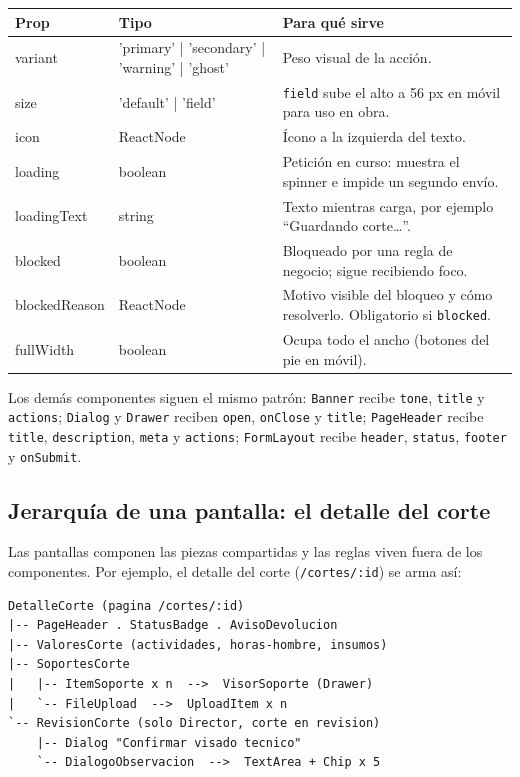 \documentclass[11pt]{article}
\begin{document}
\begin{center}
\begin{tabular}{|>{\ttfamily}m{3cm}|>{\ttfamily\raggedright\arraybackslash}m{4.4cm}|>{\raggedright\arraybackslash}m{7.8cm}|}
\hline
\textrm{\textbf{Prop}} & \textrm{\textbf{Tipo}} & \textbf{Para qué sirve} \\ \hline
variant & 'primary' | 'secondary' | 'warning' | 'ghost' & Peso visual de la acción. \\ \hline
size & 'default' | 'field' & \texttt{field} sube el alto a 56 px en móvil para uso en obra. \\ \hline
icon & ReactNode & Ícono a la izquierda del texto. \\ \hline
loading & boolean & Petición en curso: muestra el spinner e impide un segundo envío. \\ \hline
loadingText & string & Texto mientras carga, por ejemplo ``Guardando corte\ldots{}''. \\ \hline
blocked & boolean & Bloqueado por una regla de negocio; sigue recibiendo foco. \\ \hline
blockedReason & ReactNode & Motivo visible del bloqueo y cómo resolverlo. Obligatorio si \texttt{blocked}. \\ \hline
fullWidth & boolean & Ocupa todo el ancho (botones del pie en móvil). \\ \hline
\end{tabular}
\end{center}

Los demás componentes siguen el mismo patrón: \texttt{Banner} recibe \texttt{tone}, \texttt{title} y \texttt{actions}; \texttt{Dialog} y \texttt{Drawer} reciben \texttt{open}, \texttt{onClose} y \texttt{title}; \texttt{PageHeader} recibe \texttt{title}, \texttt{description}, \texttt{meta} y \texttt{actions}; \texttt{FormLayout} recibe \texttt{header}, \texttt{status}, \texttt{footer} y \texttt{onSubmit}.

\subsection*{Jerarquía de una pantalla: el detalle del corte}

Las pantallas componen las piezas compartidas y las reglas viven fuera de los componentes. Por ejemplo, el detalle del corte (\texttt{/cortes/:id}) se arma así:

\begin{verbatim}
DetalleCorte (pagina /cortes/:id)
|-- PageHeader . StatusBadge . AvisoDevolucion
|-- ValoresCorte (actividades, horas-hombre, insumos)
|-- SoportesCorte
|   |-- ItemSoporte x n  -->  VisorSoporte (Drawer)
|   `-- FileUpload  -->  UploadItem x n
`-- RevisionCorte (solo Director, corte en revision)
    |-- Dialog "Confirmar visado tecnico"
    `-- DialogoObservacion  -->  TextArea + Chip x 5
\end{verbatim}
\end{document}
